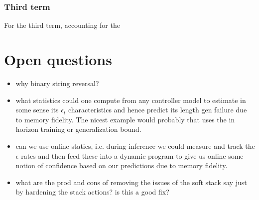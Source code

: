 \documentclass{article}
\newcommand{\eps}{\epsilon}
\begin{document}
\subsubsection*{Third term}

For the third term, accounting for the 




\section{Open questions}

\begin{itemize}
    \item why binary string reversal?
    \item what statistics could one compute from any controller model to estimate in some sense its $\eps_t$ characteristics and hence predict its length gen failure due to memory fidelity. The nicest example would probably that uses the in horizon training or generalization bound.
    \item can we use online statics, i.e. during inference we could measure and track the $\eps$ rates and then feed these into a dynamic program to give us online some notion of confidence based on our predictions due to memory fidelity.
    \item what are the prod and cons of removing the issues of the soft stack say just by hardening the stack actions? is this a good fix?
\end{itemize}
\end{document}
